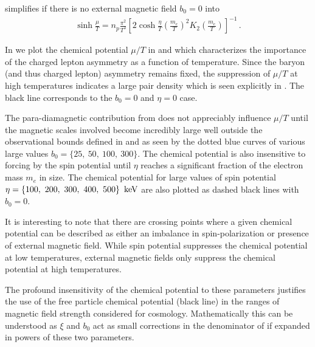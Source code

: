  simplifies if there is no external magnetic field $b_{0}=0$ into
\begin{align}
    \label{simpchem:1}
    \sinh\frac{\mu}{T}=n_{p}\frac{\pi^{2}}{T^{3}}\left[2\cosh\frac{\eta}{T}\left(\frac{m_{e}}{T}\right)^{2}K_{2}\left(\frac{m_{e}}{T}\right)\right]^{-1}\,.
\end{align}

In  we plot the chemical potential $\mu/T$ in  and  which characterizes the importance of the charged lepton asymmetry as a function of temperature. Since the baryon (and thus charged lepton) asymmetry remains fixed, the suppression of $\mu/T$ at high temperatures indicates a large pair density which is seen explicitly in . The black line corresponds to the $b_{0}=0$ and $\eta=0$ case. 

The para-diamagnetic contribution from  does not appreciably influence $\mu/T$ until the magnetic scales involved become incredibly large well outside the observational bounds defined in  and  as seen by the dotted blue curves of various large values $b_{0}=\{25,\ 50,\ 100,\ 300\}$. The chemical potential is also insensitive to forcing by the spin potential until $\eta$ reaches a significant fraction of the electron mass $m_{e}$ in size. The chemical potential for large values of spin potential $\eta=\{100,\ 200,\ 300,\ 400,\ 500\}\,\text{ keV}$ are also plotted as dashed black lines with $b_{0}=0$.

It is interesting to note that there are crossing points where a given chemical potential can be described as either an imbalance in spin-polarization or presence of external magnetic field. While spin potential suppresses the chemical potential at low temperatures, external magnetic fields only suppress the chemical potential at high temperatures.

The profound insensitivity of the chemical potential to these parameters justifies the use of the free particle chemical potential (black line) in the ranges of magnetic field strength considered for cosmology. Mathematically this can be understood as $\xi$ and $b_{0}$ act as small corrections in the denominator of  if expanded in powers of these two parameters.

